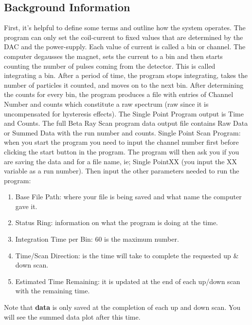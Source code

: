 \documentclass{../lab}
\begin{document}
\subsection{Background Information}

First, it's helpful to define some terms and outline how the system operates. The program can only set the coil-current to fixed values that are determined by the DAC and the power-supply. Each value of current is called a bin or channel. The computer degausses the magnet, sets the current to a bin and then starts counting the number of pulses coming from the detector. This is called integrating a bin. After a period of time, the program stops integrating, takes the number of particles it counted, and moves on to the next bin. After determining the counts for every bin, the program produces a file with entries of Channel Number and counts which constitute a raw spectrum (raw since it is uncompensated for hysteresis effects). The Single Point Program output is Time and Counts. The full Beta Ray Scan program data output file contains Raw Data or Summed Data with the run number and counts. Single Point Scan Program: when you start the program you need to input the channel number first before clicking the start button in the program. The program will then ask you if you are saving the data and for a file name, ie; Single PointXX (you input the XX variable as a run number). Then input the other parameters needed to run the program:

\begin{enumerate}
    \item Base File Path: where your file is being saved and what name the computer gave it.

    \item Status Ring: information on what the program is doing at the time.

    \item Integration Time per Bin: 60 is the maximum number.

    \item Time/Scan Direction: is the time will take to complete the requested up \& down scan.

    \item Estimated Time Remaining: it is updated at the end of each up/down scan with the remaining time.

\end{enumerate}

Note that \textbf{data} is only saved at the completion of each up and down scan. You will see the summed data plot after this time.
\end{document}
